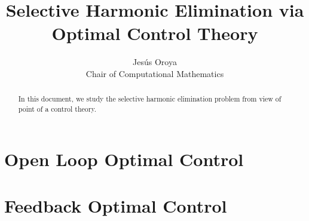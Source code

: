 \documentclass[a4paper]{article}
\title{Selective Harmonic Elimination via Optimal Control Theory}
\author{Jesús Oroya \\ Chair of Computational Mathematics}
\begin{document}
\maketitle

\begin{abstract}
    In this document, we study the selective harmonic elimination problem from view of point of a control theory. 
\end{abstract}
\tableofcontents
\newpage


\newpage
\part{Open Loop Optimal Control}


\newpage
\part{Feedback Optimal Control}

\newpage
\appendix



 


\end{document}
